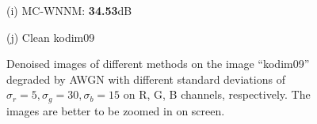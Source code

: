 \documentclass[10pt,onecolumn,letterpaper]{article}
\begin{document}
\begin{figure}
{\begin{minipage}[t]{0.195\textwidth}
{\footnotesize (i) MC-WNNM: \textbf{34.53}dB}
\end{minipage}
\begin{minipage}[t]{0.195\textwidth}
\centering
{}
{\footnotesize (j) Clean kodim09}
\end{minipage}
}
\caption{Denoised images of different methods on the image ``kodim09'' degraded by AWGN with different standard deviations of $\sigma_{r}=5, \sigma_{g}=30, \sigma_{b}=15$ on R, G, B channels, respectively. The images are better to be zoomed in on screen.}
\label{f1}
\vspace{2mm}
\end{figure}
\end{document}
